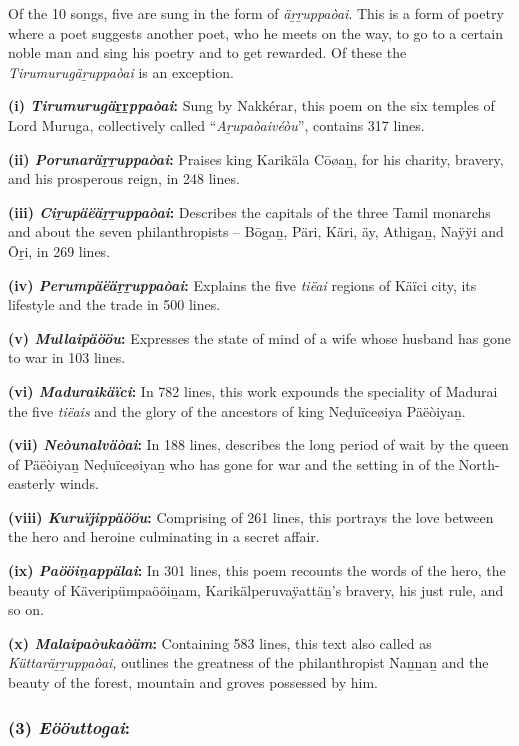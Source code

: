 Of the 10 songs, five are sung in the form of \textit{äṟṟuppaòai}. This is a form of poetry where a poet suggests another poet, who he meets on the way, to go to a certain noble man and sing his poetry and to get rewarded. Of these the \textit{Tirumurugäṟuppaòai} is an exception.

\textbf{(i) \textit{Tirumurugä}ṟṟ\textit{ppaòai}:} Sung by Nakkérar, this poem on the six temples of Lord Muruga, collectively called “\textit{Aṟupaòaivéòu}”, contains 317 lines.

\textbf{(ii) \textit{Porunaräṟṟuppaòai}:} Praises king Karikäla Cōøaṉ, for his charity, bravery, and his prosperous reign, in 248 lines.

\textbf{(iii) \textit{Ciṟupäëäṟṟuppaòai}:} Describes the capitals of the three Tamil monarchs and about the seven philanthropists – Bōgaṉ, Päri, Käri, äy, Athigaṉ, Naÿÿi and Ōṟi, in 269 lines.

\textbf{(iv) \textit{Perumpäëäṟṟuppaòai}:} Explains the five \textit{tiëai} regions of Käïci city, its lifestyle and the trade in 500 lines.

\textbf{(v) \textit{Mullaipäööu}:} Expresses the state of mind of a wife whose husband has gone to war in 103 lines.

\textbf{(vi) \textit{Maduraikäïci}:} In 782 lines, this work expounds the speciality of Madurai the five \textit{tiëais} and the glory of the ancestors of king Neḍuïceøiya Päëòiyaṉ.

\textbf{(vii) \textit{Neòunalväòai}:} In 188 lines, describes the long period of wait by the queen of Päëòiyaṉ Neḍuïceøiyaṉ who has gone for war and the setting in of the North-easterly winds.

\textbf{(viii) \textit{Kuruïjippäööu}:} Comprising of 261 lines, this portrays the love between the hero and heroine culminating in a secret affair.

\textbf{(ix) \textit{Paööiṉappälai}:} In 301 lines, this poem recounts the words of the hero, the beauty of Käveripümpaööiṉam, Karikälperuvaÿattäṉ's bravery, his just rule, and so on.

\textbf{(x) \textit{Malaipaòukaòäm}:} Containing 583 lines, this text also called as \textit{Küttaräṟṟuppaòai,} outlines the greatness of the philanthropist Naṉṉaṉ and the beauty of the forest, mountain and groves possessed by him.


\subsubsection*{(3) \textit{Eööuttogai}:}

